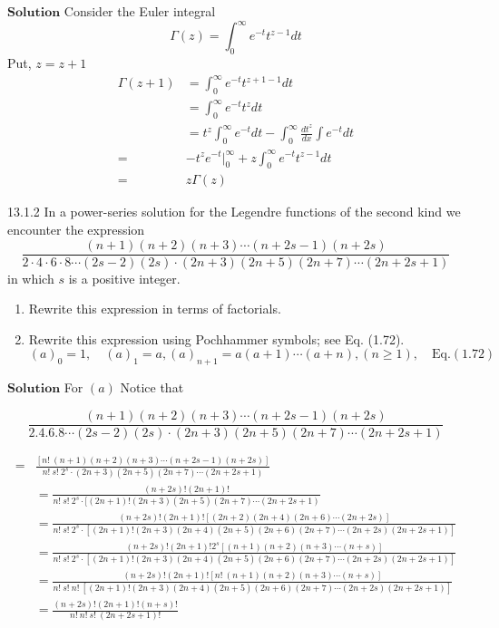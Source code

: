 $\boxed{\textbf{Solution}}$ Consider the Euler integral 
$$\Gamma (z)=\int_{0}^{\infty} e^{-t} t^{z-1} d t$$
Put, $z=z+1$
$$
\begin{aligned}
\Gamma(z+1) &=\int_{0}^{\infty} e^{-t} t^{z+1-1} d t \\
&=\int_{0}^{\infty} e^{-t} t^{z} d t \\
&=t^{z} \int_{0}^{\infty} e^{-t} d t-\int_{0}^{\infty} \frac{d t^{z}}{d x} \int e^{-t} d t \\
=&-t^{z} e^{-t}\Big|_{0} ^{\infty}+z \int_{0}^{\infty} e^{-t} t^{z-1} d t \\
=& z \Gamma(z)
\end{aligned}
$$



\begin{mybox}{13.1.2}
In a power-series solution for the Legendre functions of the second kind we encounter the expression
$$
\frac{(n+1)(n+2)(n+3) \cdots(n+2 s-1)(n+2 s)}{2 \cdot 4 \cdot 6 \cdot 8 \cdots(2 s-2)(2 s) \cdot(2 n+3)(2 n+5)(2 n+7) \cdots(2 n+2 s+1)}
$$
in which $s$ is a positive integer.
\begin{enumerate}[$(a)$]
\item Rewrite this expression in terms of factorials.
\item Rewrite this expression using Pochhammer symbols; see Eq. (1.72).
$$
(a)_{0}=1, \quad(a)_{1}=a,(a)_{n+1}=a(a+1) \cdots(a+n),(n \geq 1), \quad \text{Eq.}(1.72)
$$
\end{enumerate}
\end{mybox}

$\boxed{\textbf{Solution}}$ For $(a)$ Notice that

$$\frac{(n+1)(n+2)(n+3) \cdots(n+2 s-1)(n+2 s)}{2.4 .6 .8  \cdots (2 s-2)(2 s) \cdot(2 n+3)(2 n+5)(2 n+7) \cdots(2 n+2 s+1)}$$

$$
\begin{aligned}
=&\frac{[n! \ (n+1)(n+2)(n+3) \cdots(n+2 s-1)(n+2 s)]}{n! \  s! \  2^{s} \cdot(2 n+3)(2 n+5)(2 n+7) \cdots(2 n+2 s+1)}\\
&=\frac{(n+2 s) !(2 n+1) !}{n! \  s! \  2^{s} \cdot[(2 n+1) !(2 n+3)(2 n+5)(2 n+7) \cdots(2 n+2 s+1)} \\
&=\frac{(n+2 s) !(2 n+1) ![(2 n+2)(2 n+4)(2 n+6) \cdots(2 n+2 s)]}{n! \  s! \  2^{s} \cdot[(2 n+1) !(2 n+3)(2 n+4)(2 n+5)(2 n+6)(2 n+7) \cdots(2 n+2 s)(2 n+2 s+1)]} \\
& =\frac{(n+2 s) !(2 n+1) ! 2^{s}[(n+1)(n+2)(n+3) \cdots(n+s)]}{n! \  s! \  2^{s} \cdot[(2 n+1) !(2 n+3)(2 n+4)(2 n+5)(2 n+6)(2 n+7) \cdots(2 n+2 s)(2 n+2 s+1)]}\\
&=\frac{(n+2 s) !(2 n+1) ![n! \ (n+1)(n+2)(n+3) \cdots(n+s)]}{n! \  s! \  n! \ [(2 n+1) !(2 n+3)(2 n+4)(2 n+5)(2 n+6)(2 n+7) \cdots(2 n+2 s)(2 n+2 s+1)]} \\
&=\frac{(n+2 s) !(2 n+1) !(n+s) !}{n! \  n! \  s! \ (2 n+2 s+1) !}
\end{aligned}
$$




